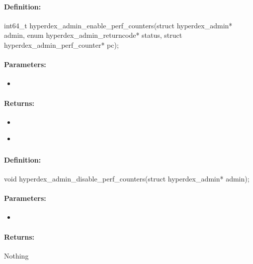 \paragraph{Definition:}
\begin{ccode}
int64_t hyperdex_admin_enable_perf_counters(struct hyperdex_admin* admin,
        enum hyperdex_admin_returncode* status,
        struct hyperdex_admin_perf_counter* pc);
\end{ccode}

\paragraph{Parameters:}
\begin{itemize}[noitemsep]
\item {}\\

\end{itemize}

\paragraph{Returns:}
\begin{itemize}[noitemsep]
\item {}\\

\item {}\\

\end{itemize}

\pagebreak
\subsubsection{}
\label{api:c:disable_perf_counters}


\paragraph{Definition:}
\begin{ccode}
void hyperdex_admin_disable_perf_counters(struct hyperdex_admin* admin);
\end{ccode}

\paragraph{Parameters:}
\begin{itemize}[noitemsep]
\item {}\\

\end{itemize}

\paragraph{Returns:}
Nothing